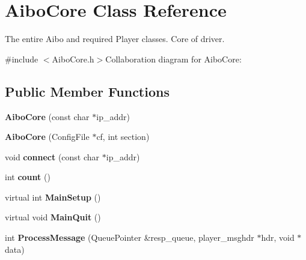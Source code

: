 \hypertarget{classAiboCore}{
\section{AiboCore Class Reference}
\label{classAiboCore}
}


The entire Aibo and required Player classes. Core of driver.  


{\ttfamily \#include $<$AiboCore.h$>$}Collaboration diagram for AiboCore:\subsection*{Public Member Functions}
\begin{DoxyCompactItemize}
\item 
\hypertarget{classAiboCore_a673c057ac82df3fc6c0d828a98408bea}{
{\bfseries AiboCore} (const char $\ast$ip\_\-addr)}
\label{classAiboCore_a673c057ac82df3fc6c0d828a98408bea}

\item 
\hypertarget{classAiboCore_a377640056394d6235609688045288fe7}{
{\bfseries AiboCore} (ConfigFile $\ast$cf, int section)}
\label{classAiboCore_a377640056394d6235609688045288fe7}

\item 
\hypertarget{classAiboCore_a078c3b2541d57e7455094ef7c9e46c80}{
void {\bfseries connect} (const char $\ast$ip\_\-addr)}
\label{classAiboCore_a078c3b2541d57e7455094ef7c9e46c80}

\item 
\hypertarget{classAiboCore_a7cf6b6a288291b36254dc29ae089d6bc}{
int {\bfseries count} ()}
\label{classAiboCore_a7cf6b6a288291b36254dc29ae089d6bc}

\item 
\hypertarget{classAiboCore_a940aa3f41c521cfc8e1ea69b8a616648}{
virtual int {\bfseries MainSetup} ()}
\label{classAiboCore_a940aa3f41c521cfc8e1ea69b8a616648}

\item 
\hypertarget{classAiboCore_a4a06b4d7957998e00ffa662ff9345662}{
virtual void {\bfseries MainQuit} ()}
\label{classAiboCore_a4a06b4d7957998e00ffa662ff9345662}

\item 
\hypertarget{classAiboCore_a2612cdb01d22f3b18fa0c42ec15b4525}{
int {\bfseries ProcessMessage} (QueuePointer \&resp\_\-queue, player\_\-msghdr $\ast$hdr, void $\ast$data)}
\label{classAiboCore_a2612cdb01d22f3b18fa0c42ec15b4525}

\end{DoxyCompactItemize}
